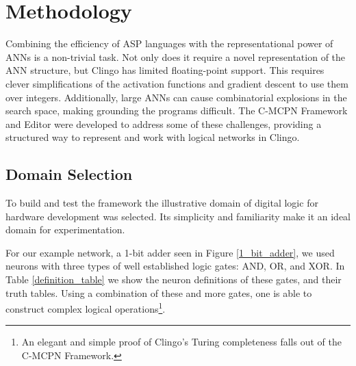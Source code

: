 \section{Methodology}\label{methodology}

Combining the efficiency of ASP languages with the representational power of ANNs is a non-trivial task. Not only does it require a novel representation of the ANN structure, but Clingo has limited floating-point support. This requires clever simplifications of the activation functions and gradient descent to use them over integers. Additionally, large ANNs can cause combinatorial explosions in the search space, making grounding the programs difficult. The C-MCPN Framework and Editor were developed to address some of these challenges, providing a structured way to represent and work with logical networks in Clingo.

\subsection{Domain Selection}

To build and test the framework the illustrative domain of digital logic for hardware development was selected. Its simplicity and familiarity make it an ideal domain for experimentation. 

For our example network, a 1-bit adder seen in Figure \ref{1_bit_adder}, we used neurons with three types of well established logic gates: AND, OR, and XOR. In Table \ref{definition_table} we show the neuron definitions of these gates, and their truth tables. Using a combination of these and more gates, one is able to construct complex logical operations\footnote{An elegant and simple proof of Clingo's Turing completeness falls out of the C-MCPN Framework.}.

